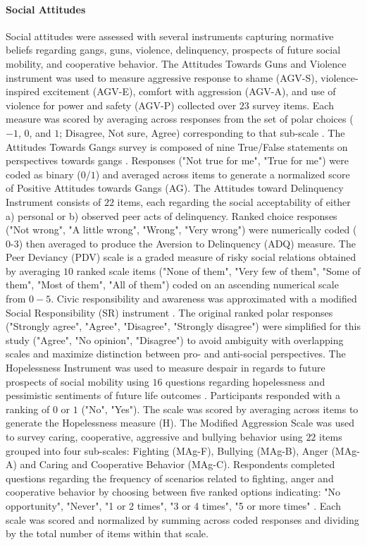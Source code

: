 \documentclass[utf8]{article}
\begin{document}
\paragraph{Social Attitudes}
Social attitudes were assessed with several instruments capturing normative beliefs regarding gangs, guns, violence, delinquency, prospects of future social mobility, and cooperative behavior. The Attitudes Towards Guns and Violence instrument was used to measure aggressive response to shame (AGV-S), violence-inspired excitement (AGV-E), comfort with aggression (AGV-A), and use of violence for power and safety (AGV-P) collected over $23$ survey items. Each measure was scored by averaging across responses from the set of polar choices ($-1$, $0$, and $1$; Disagree, Not sure, Agree) corresponding to that sub-scale \citep{shapiro1997development}. The Attitudes Towards Gangs survey is composed of nine True/False statements on perspectives towards gangs \citep{nadel1996cycle}. Responses ("Not true for me", "True for me") were coded as binary ($0$/$1$) and averaged across items to generate a normalized score of Positive Attitudes towards Gangs (AG). The Attitudes toward Delinquency Instrument consists of $22$ items, each regarding the social acceptability of either a) personal or b) observed peer acts of delinquency. Ranked choice responses ("Not wrong", "A little wrong", "Wrong", "Very wrong") were numerically coded ($0$-$3$) then averaged to produce the Aversion to Delinquency (ADQ) measure. The Peer Deviancy (PDV) scale is a graded measure of risky social relations \citep{project2004multisite} obtained by averaging $10$ ranked scale items ("None of them", "Very few of them", "Some of them", "Most of them", "All of them") coded on an ascending numerical scale from $0-5$. Civic responsibility and awareness was approximated with a modified Social Responsibility (SR) instrument \citep{nedwek1987social}. The original ranked polar responses ("Strongly agree", "Agree", "Disagree", "Strongly disagree") were simplified for this study ("Agree", "No opinion", "Disagree") to avoid ambiguity with overlapping scales and maximize distinction between pro- and anti-social perspectives. The Hopelessness Instrument was used to measure despair in regards to future prospects of social mobility using $16$ questions regarding hopelessness and pessimistic sentiments of future life outcomes \citep{kazdin1983hopelessness}. Participants responded with a ranking of $0$ or $1$ ("No", "Yes"). The scale was scored by averaging across items to generate the Hopelessness measure (H). The Modified Aggression Scale was used to survey caring, cooperative, aggressive and bullying behavior using $22$ items grouped into four sub-scales: Fighting (MAg-F), Bullying (MAg-B), Anger (MAg-A) and Caring and Cooperative Behavior (MAg-C). Respondents completed questions regarding the frequency of scenarios related to fighting, anger and cooperative behavior by choosing between five ranked options indicating: "No opportunity", "Never", "1 or 2 times", "3 or 4 times", "5 or more times" \citep{bosworth1995teen}. Each scale was scored and normalized by summing across coded responses and dividing by the total number of items within that scale. 
\end{document}
